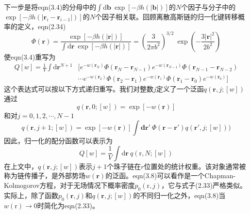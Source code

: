 下一步是将eqn(3.4)的分母中的$\int\mathrm{d}\mathbf{b}~\exp[-\beta h(\left|\mathbf{b}\right|)]$的$N$个因子与分子中的$\exp[-\beta h(\left|\mathbf{r}_i-\mathbf{r}_{i-1}\right|)]$的$N$个因子相关联。回顾离散高斯链的归一化键转移概率的定义，eqn(2.34)
\begin{equation}
\Phi(\mathbf{r})=\frac{\exp[-\beta h(\left|\mathbf{r}\right|)]}{\int\mathrm{d}\mathbf{r}~\exp[-\beta h(\left|\mathbf{r}\right|)]}=\left(\frac{3}{2\pi b^2}\right)^{3/2}~\exp\left(-\frac{3\left|\mathbf{r}\right|^2}{2b^2}\right)
\end{equation}
使eqn(3.4)重写为
\begin{equation}
\begin{aligned}
Q[w]=\frac{1}{V}\int\mathrm{d}\mathbf{r}^{N+1}&[e^{-w(\mathbf{r}_N)}\Phi(\mathbf{r}_N-\mathbf{r}_{N-1})e^{-w(\mathbf{r}_{N-1})}\Phi(\mathbf{r}_{N-1}-\mathbf{r}_{N-2})\\
&\cdots e^{-w(\mathbf{r}_2)}\Phi(\mathbf{r}_2-\mathbf{r}_1)e^{-w(\mathbf{r}_1)}\Phi(\mathbf{r}_1-\mathbf{r}_0)e^{-w(\mathbf{r}_0)}]
\end{aligned}
\end{equation}
这个表达式可以按以下方式递归重写。我们对整数$j$定义了一个泛函$q(\mathbf{r},j;[w])$通过
\begin{equation}
q(\mathbf{r},0;[w])=\exp[-w(\mathbf{r})]
\end{equation}
和对$j=0,1,2,\cdots,N-1$
\begin{equation}
q(\mathbf{r},j+1;[w])=\exp[-w(\mathbf{r})]\int\mathbf{d}\mathbf{r}'~\Phi(\mathbf{r}-\mathbf{r}')q(\mathbf{r}',j;[w]))
\end{equation}
因此，归一化的配分函数可以表示为
\begin{equation}
Q[w]=\frac{1}{V}\int\mathrm{d}\mathbf{r}~q(\mathrm{r},N;[w])
\end{equation}
在上文中，$q(\mathbf{r},j;[w])$表示$j+1$个珠子链在$r$位置处的统计权重。该对象通常被称为链传播子，是外部势场$w(\mathbf{r})$的泛函。eqn(3.8)可以看作是一个Chapman-Kolmogorov方程，对于无场情况下概率密度$p_0(\mathrm{r},j)$，它与式子(2.33)严格类似。实际上，除了函数$p_0(\mathbf{r},j)$和$q(\mathbf{r},j;[w])$的不同归一化之外，eqn(3.8)当$w(\mathrm{r})\rightarrow 0$时简化为eqn(2.33)。

